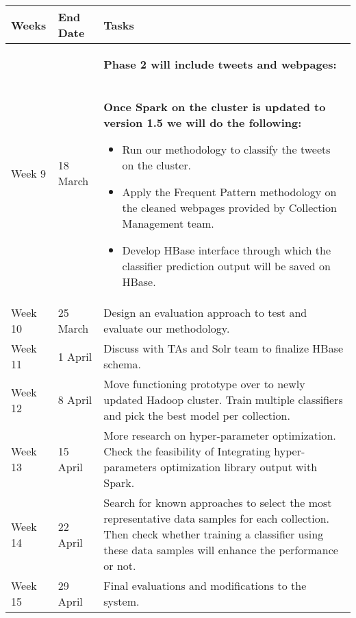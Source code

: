 \newpage
\begin{tabularx}{155mm}{|>{\setlength\hsize{.2\hsize}\setlength\linewidth{\hsize}}X|>{\setlength\hsize{.3\hsize}\setlength\linewidth{\hsize}}X|>{\setlength\hsize{1.5\hsize}\setlength\linewidth{\hsize}}X|}
\hline
Weeks & End Date & Tasks \\
\hline
Week 9
&
18 March
&
\textbf{Phase 2 will include tweets and webpages:} \

\textbf{Once Spark on the cluster is updated to version 1.5 we will do the following:}

\begin{itemize}
\item Run our methodology to classify the tweets on the cluster.
\item Apply the Frequent Pattern methodology on the cleaned webpages provided by Collection Management team.
\item Develop HBase interface through which the classifier prediction output will be saved on HBase.
\end{itemize}\\
\hline

Week 10
&
25 March
&
Design an evaluation approach to test and evaluate our methodology. \\
\hline

Week 11
&
1 April
&
Discuss with TAs and Solr team to finalize HBase schema. \\
\hline

Week 12
&
8 April
&
Move functioning prototype over to newly updated Hadoop cluster. Train multiple classifiers and pick the best model per collection. \\
\hline

Week 13
&
15 April
&
More research on hyper-parameter optimization. Check the feasibility of Integrating hyper-parameters optimization library \cite{bergstra2013hyperopt} output with Spark. \\
\hline

Week 14
&
22 April
&
Search for known approaches to select the most representative data samples for each collection. Then check whether training a classifier using these data samples will enhance the performance or not. \\
\hline

Week 15
&
29 April
&
Final evaluations and modifications to the system. \\
\hline

\end{tabularx}
